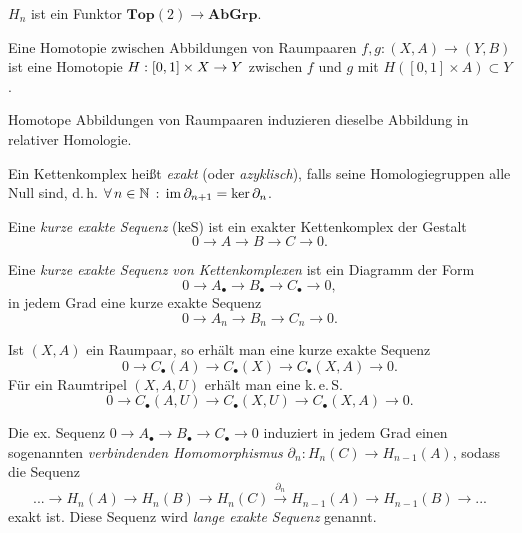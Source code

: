 \documentclass{cheat-sheet}
\newcommand{\CC}[1]{{#1}_{\bullet}} %
\newcommand{\Top}{\mathbf{Top}} %
\newcommand{\AbGrp}{\mathbf{AbGrp}} %
\begin{document}
\begin{bem}
  $H_n$ ist ein Funktor $\Top(2) \to \AbGrp$.
\end{bem}

\begin{defn}
  Eine Homotopie zwischen Abbildungen von Raumpaaren $f, g : (X, A) \to (Y, B)$ ist eine Homotopie $H : \left[ 0, 1 \right] \times X \to Y$ zwischen $f$ und $g$ mit $H([0,1] \times A) \subset Y$.
\end{defn}

\begin{prop}
  Homotope Abbildungen von Raumpaaren induzieren dieselbe Abbildung in relativer Homologie.
\end{prop}

\begin{defn}
  Ein Kettenkomplex heißt \emph{exakt} (oder \emph{azyklisch}), falls seine Homologiegruppen alle Null sind, d.\,h. $\forall \, {n \in \mathbb{N}} \,:\, \mathop{\mathrm{im}} \partial_{n+1} = \ker \partial_n$.
\end{defn}

\begin{defn}
  Eine \emph{kurze exakte Sequenz} (keS) ist ein exakter Kettenkomplex der Gestalt
  \[ 0 \to A \to B \to C \to 0. \]
\end{defn}

\begin{defn}
  Eine \emph{kurze exakte Sequenz von Kettenkomplexen} ist ein Diagramm der Form
  \[ 0 \to \CC{A} \to \CC{B} \to \CC{C} \to 0, \]
  in jedem Grad eine kurze exakte Sequenz
  \[ 0 \to A_n \to B_n \to C_n \to 0. \]
\end{defn}

\begin{bem}
  Ist $(X, A)$ ein Raumpaar, so erhält man eine kurze exakte Sequenz
  \[ 0 \to \CC{C}(A) \to \CC{C}(X) \to \CC{C}(X, A) \to 0. \]
  Für ein Raumtripel $(X, A, U)$ erhält man eine k.\,e.\,S.
  \[ 0 \to \CC{C}(A, U) \to \CC{C}(X, U) \to \CC{C}(X, A) \to 0. \]
\end{bem}

\begin{prop}[Schlangenlemma]
  Die ex. Sequenz $0 \to \CC{A} \to \CC{B} \to \CC{C} \to 0$ induziert in jedem Grad einen sogenannten \emph{verbindenden Homomorphismus} $\partial_n : H_n(C) \to H_{n-1}(A)$, sodass die Sequenz
  \[ ... \to H_n(A) \to H_n(B) \to H_n(C) \xrightarrow{\partial_n} H_{n-1}(A) \to H_{n-1}(B) \to ... \]
  exakt ist. Diese Sequenz wird \emph{lange exakte Sequenz} genannt.
\end{prop}
\end{document}
